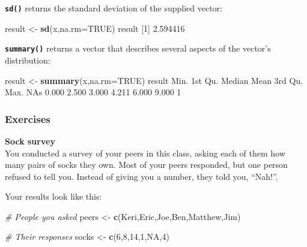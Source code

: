 \documentclass[
]{book}
\newenvironment{Shaded}{\begin{snugshade}}{\end{snugshade}}
\newcommand{\AttributeTok}[1]{\textcolor[rgb]{0.13,0.29,0.53}{#1}}
\newcommand{\CommentTok}[1]{\textcolor[rgb]{0.56,0.35,0.01}{\textit{#1}}}
\newcommand{\ConstantTok}[1]{\textcolor[rgb]{0.56,0.35,0.01}{#1}}
\newcommand{\DecValTok}[1]{\textcolor[rgb]{0.00,0.00,0.81}{#1}}
\newcommand{\FloatTok}[1]{\textcolor[rgb]{0.00,0.00,0.81}{#1}}
\newcommand{\FunctionTok}[1]{\textcolor[rgb]{0.13,0.29,0.53}{\textbf{#1}}}
\newcommand{\NormalTok}[1]{#1}
\newcommand{\OtherTok}[1]{\textcolor[rgb]{0.56,0.35,0.01}{#1}}
\newcommand{\StringTok}[1]{\textcolor[rgb]{0.31,0.60,0.02}{#1}}
\begin{document}
\textbf{\texttt{sd()}} returns the standard deviation of the supplied vector:

\begin{Shaded}
\begin{Highlighting}[]
\NormalTok{result }\OtherTok{\textless{}{-}} \FunctionTok{sd}\NormalTok{(x,}\AttributeTok{na.rm=}\ConstantTok{TRUE}\NormalTok{)}
\NormalTok{result}
\NormalTok{[}\DecValTok{1}\NormalTok{] }\FloatTok{2.594416}
\end{Highlighting}
\end{Shaded}

\textbf{\texttt{summary()}} returns a vector that describes several aspects of the vector's distribution:

\begin{Shaded}
\begin{Highlighting}[]
\NormalTok{result }\OtherTok{\textless{}{-}} \FunctionTok{summary}\NormalTok{(x,}\AttributeTok{na.rm=}\ConstantTok{TRUE}\NormalTok{)}
\NormalTok{result}
\NormalTok{   Min. }\DecValTok{1}\NormalTok{st Qu.  Median    Mean }\DecValTok{3}\NormalTok{rd Qu.    Max.    NA}\StringTok{\textquotesingle{}s }
\StringTok{  0.000   2.500   3.000   4.211   6.000   9.000       1 }
\end{Highlighting}
\end{Shaded}

\subsubsection*{Exercises}\label{exercises-4}

\textbf{Sock survey}\\
You conducted a survey of your peers in this class, asking each of them how many pairs of socks they own. Most of your peers responded, but one person refused to tell you. Instead of giving you a number, they told you, ``Nah!''.

Your results look like this:

\begin{Shaded}
\begin{Highlighting}[]
\CommentTok{\# People you asked}
\NormalTok{peers }\OtherTok{\textless{}{-}} \FunctionTok{c}\NormalTok{(}\StringTok{\textquotesingle{}Keri\textquotesingle{}}\NormalTok{,}\StringTok{\textquotesingle{}Eric\textquotesingle{}}\NormalTok{,}\StringTok{\textquotesingle{}Joe\textquotesingle{}}\NormalTok{,}\StringTok{\textquotesingle{}Ben\textquotesingle{}}\NormalTok{,}\StringTok{\textquotesingle{}Matthew\textquotesingle{}}\NormalTok{,}\StringTok{\textquotesingle{}Jim\textquotesingle{}}\NormalTok{)}

\CommentTok{\# Their responses}
\NormalTok{socks }\OtherTok{\textless{}{-}} \FunctionTok{c}\NormalTok{(}\DecValTok{6}\NormalTok{,}\DecValTok{8}\NormalTok{,}\DecValTok{14}\NormalTok{,}\DecValTok{1}\NormalTok{,}\ConstantTok{NA}\NormalTok{,}\DecValTok{4}\NormalTok{)}
\end{Highlighting}
\end{Shaded}
\end{document}
